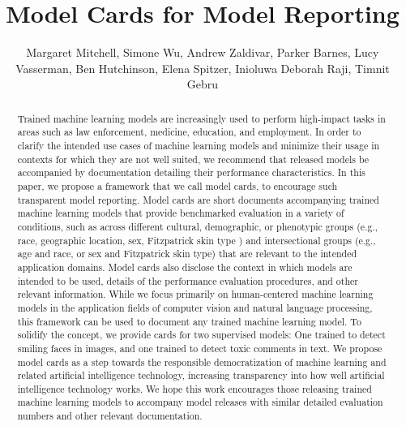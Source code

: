 \documentclass[format=sigconf]{acmart}
\begin{document}
\title{Model Cards for Model Reporting}

\author{Margaret Mitchell, Simone Wu, Andrew Zaldivar, Parker Barnes, Lucy Vasserman, Ben Hutchinson, Elena Spitzer, Inioluwa Deborah Raji, Timnit Gebru}

\begin{abstract}
Trained machine learning models are increasingly used to perform high-impact 
tasks in areas such as law enforcement, medicine, education, and employment. In order to clarify the intended use cases of machine learning models and minimize their usage in contexts for which they are not well suited, we recommend that released models be accompanied by documentation detailing their performance characteristics. In this paper, we propose a framework that we call model cards, to encourage such transparent model reporting. Model cards are short documents accompanying trained machine learning models that provide benchmarked evaluation in a variety of conditions, such as across different cultural, demographic, or phenotypic groups (e.g., race, geographic location, sex, Fitzpatrick skin type \cite{fitzpatrick}) and intersectional groups (e.g., age and race, or sex and Fitzpatrick skin type) that are relevant to the intended application domains. Model cards also disclose the context in which models are intended to be used, details of the performance evaluation procedures, and other relevant information. While we focus primarily on human-centered machine learning models in the application fields of computer vision and natural language processing, this framework can be used to document any trained machine learning model. To solidify the concept, we provide cards for two supervised models: One trained to detect smiling faces in images, and one trained to detect toxic comments in text. We propose model cards as a step towards the responsible democratization of machine learning and related artificial intelligence technology, increasing transparency into how well artificial intelligence technology works.  We hope this work encourages those releasing trained machine learning models to accompany model releases with similar detailed evaluation numbers and other relevant documentation.
\end{abstract}

\maketitle
\end{document}
